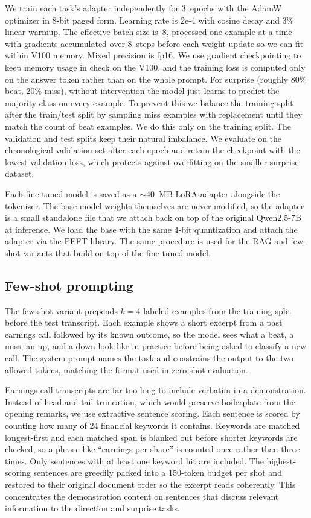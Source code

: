 \documentclass[11pt]{article}
\begin{document}
We train each task's adapter independently for 3~epochs with the
AdamW optimizer in 8-bit paged form. Learning rate is 2e-4 with
cosine decay and 3\% linear warmup. The effective batch size is~8,
processed one example at a time with gradients accumulated over
8~steps before each weight update so we can fit within V100 memory.
Mixed precision is fp16. We use gradient checkpointing to keep
memory usage in check on the V100, and the training loss is
computed only on the answer token rather than on the whole prompt.
For surprise (roughly 80\% beat, 20\% miss), without intervention
the model just learns to predict the majority class on every
example. To prevent this we balance the training split after the
train/test split by sampling miss examples with replacement until
they match the count of beat examples. We do this only on the
training split. The validation and test splits keep their natural
imbalance. We evaluate on the chronological validation
set after each epoch and retain the checkpoint with the lowest
validation loss, which protects against overfitting on the smaller
surprise dataset.

Each fine-tuned model is saved as a $\sim$40~MB LoRA adapter
alongside the tokenizer. The base model weights themselves are
never modified, so the adapter is a small standalone file that we
attach back on top of the original Qwen2.5-7B at inference. We load
the base with the same 4-bit quantization and attach the adapter
via the PEFT library. The same procedure is used for the RAG and
few-shot variants that build on top of the fine-tuned model.

\subsection{Few-shot prompting}
\label{sec:prompt}

The few-shot variant prepends $k=4$ labeled examples from the training split before the test transcript. Each example shows a short excerpt from a past earnings call followed by its known outcome, so the model sees what a beat, a miss, an up, and a down look like in practice before being asked to classify a new call. The system prompt names the task and constrains the output to the two allowed tokens, matching the format used in zero-shot evaluation.

Earnings call transcripts are far too long to include verbatim in a demonstration. Instead of head-and-tail truncation, which would preserve boilerplate from the opening remarks, we use extractive sentence scoring. Each sentence is scored by counting how many of 24 financial keywords it contains. Keywords are matched longest-first and each matched span is blanked out before shorter keywords are checked, so a phrase like “earnings per share” is counted once rather than three times. Only sentences with at least one keyword hit are included. The highest-scoring sentences are greedily packed into a 150-token budget per shot and restored to their original document order so the excerpt reads coherently. This concentrates the demonstration content on sentences that discuss relevant information to the direction and surprise tasks.
\end{document}

